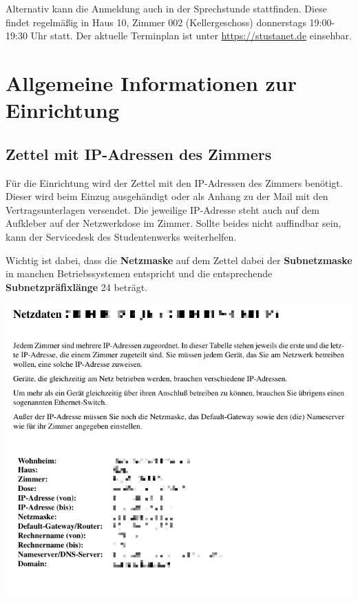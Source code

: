 \documentclass[a4paper,12pt]{scrartcl}
\begin{document}
Alternativ kann die Anmeldung auch in der Sprechstunde stattfinden.
Diese findet regelmäßig in Haus 10, Zimmer 002 (Kellergeschoss) donnerstags 19:00-19:30 Uhr statt.
Der aktuelle Terminplan ist unter \mbox{\url{https://stustanet.de}} einsehbar.

\section{Allgemeine Informationen zur Einrichtung}
\label{sec:general}

\subsection{Zettel mit IP-Adressen des Zimmers}
\label{ip_sheet}
\begin{minipage}{0.57\textwidth}
Für die Einrichtung wird der Zettel mit den IP-Adressen des Zimmers benötigt.
Dieser wird beim Einzug ausgehändigt oder als Anhang zu der Mail mit den Vertragsunterlagen versendet.
Die jeweilige IP-Adresse steht auch auf dem Aufkleber auf der Netzwerkdose im Zimmer.
Sollte beides nicht auffindbar sein, kann der Servicedesk des Studentenwerks weiterhelfen.

Wichtig ist dabei, dass die \textbf{Netzmaske} auf dem Zettel dabei der \textbf{Subnetzmaske} in manchen Betriebssystemen entspricht und die entsprechende \textbf{Subnetzpräfixlänge} 24 beträgt.
\end{minipage}
\hfill
\begin{minipage}{0.4\textwidth}
\includegraphics[width=\linewidth]{Bilder/ip_zettel}
\end{minipage}
\end{document}
